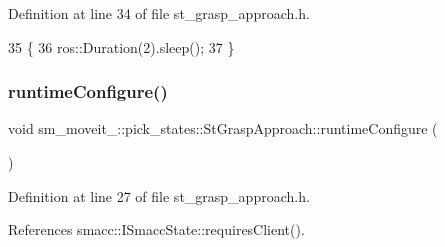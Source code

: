 Definition at line 34 of file st\+\_\+grasp\+\_\+approach.\+h.


\begin{DoxyCode}
35     \{
36         ros::Duration(2).sleep();        
37     \}
\end{DoxyCode}
\mbox{\label{structsm__moveit__4_1_1pick__states_1_1StGraspApproach_a720bc0cdf90f16b038c22fdb717bb3a7}} 
\subsubsection{\texorpdfstring{runtime\+Configure()}{runtimeConfigure()}}
{\footnotesize\ttfamily void sm\+\_\+moveit\+\_\+::pick\+\_\+states\+::\+St\+Grasp\+Approach\+::runtime\+Configure (\begin{DoxyParamCaption}{ }\end{DoxyParamCaption})\hspace{0.3cm}{\ttfamily [inline]}}



Definition at line 27 of file st\+\_\+grasp\+\_\+approach.\+h.



References smacc\+::\+I\+Smacc\+State\+::requires\+Client().


